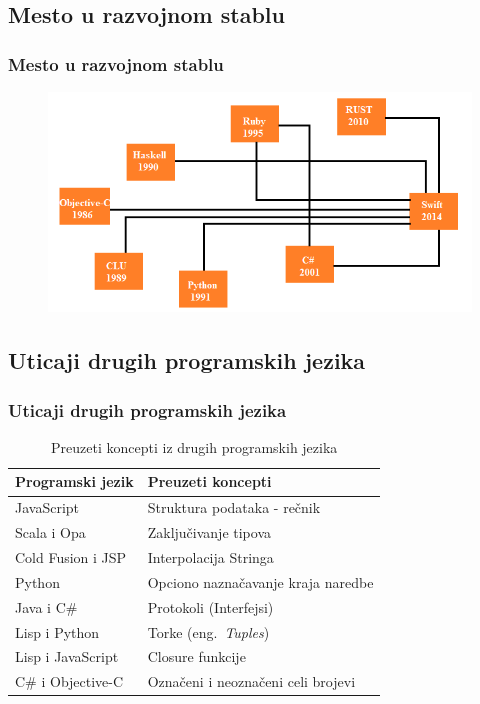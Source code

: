 \documentclass{beamer}
\begin{document}
\subsection{Mesto u razvojnom stablu}
\begin{frame}
\frametitle{ Mesto u razvojnom stablu}

\begin{figure}[h!]
\begin{center}
\includegraphics[scale=0.5]{razvojno_stablo.png}
\end{center}
\label{fig:razvojno_stablo}
\end{figure}

\end{frame}
\subsection{Uticaji drugih programskih jezika}
\begin{frame}
\frametitle{Uticaji drugih programskih jezika}

\begin{table}[h!]
\begin{center}
\caption{Preuzeti koncepti iz drugih programskih jezika}
\begin{tabular}{|l|l|} \hline
\label{tab:koncepti}
\textbf{Programski jezik} & \textbf{Preuzeti koncepti} \\ \hline
JavaScript & Struktura podataka - rečnik  \\ \hline
Scala i Opa & Zaključivanje tipova \\ \hline
Cold Fusion i JSP & Interpolacija Stringa \\ \hline
Python & Opciono naznačavanje kraja naredbe \\ \hline
Java i C\# & Protokoli (Interfejsi) \\ \hline
Lisp i Python & Torke (eng.~{\em Tuples}) \\ \hline
Lisp i JavaScript &  Closure funkcije \\ \hline
C\# i Objective-C & Označeni i neoznačeni celi brojevi \\ \hline
\end{tabular}
\end{center}
\end{table}
\end{frame}
\end{document}
